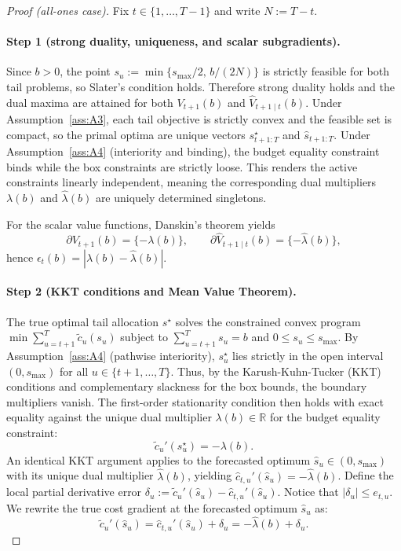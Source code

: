 \documentclass[11pt]{article}
\newcommand{\R}{\mathbb{R}}
\newcommand{\1}{\mathbf{1}}
\begin{document}
\begin{proof}[Proof (all-ones case)]
  Fix $t \in \{1,\dots,T-1\}$ and write $N := T-t$.

  \paragraph{Step 1 (strong duality, uniqueness, and scalar subgradients).}
  Since $b>0$, the point $s_u := \min\{s_{\max}/2,\,b/(2N)\}$ is strictly feasible for both tail problems, so Slater's condition holds.
  Therefore strong duality holds and the dual maxima are attained for both $V_{t+1}(b)$ and $\hat{V}_{t+1 \mid t}(b)$.
  Under Assumption~\ref{ass:A3}, each tail objective is strictly convex and the feasible set is compact, so the primal optima are unique vectors $s^{\star}_{t+1:T}$ and $\hat{s}_{t+1:T}$.
  Under Assumption~\ref{ass:A4} (interiority and binding), the budget equality constraint binds while the box constraints are strictly loose. This renders the active constraints linearly independent, meaning the corresponding dual multipliers $\lambda(b)$ and $\hat{\lambda}(b)$ are uniquely determined singletons.

  For the scalar value functions, Danskin's theorem yields
  \begin{equation*}
    \partial V_{t+1}(b) = \{-\lambda(b)\},
    \qquad
    \partial \hat{V}_{t+1\mid t}(b) = \{-\hat{\lambda}(b)\},
  \end{equation*}
  hence $\epsilon_t(b)=|\lambda(b)-\hat{\lambda}(b)|$.

  \paragraph{Step 2 (KKT conditions and Mean Value Theorem).}
  The true optimal tail allocation $s^{\star}$ solves the constrained convex program $\min \sum_{u=t+1}^T \tilde{c}_u(s_u)$ subject to $\sum_{u=t+1}^T s_u = b$ and $0 \leq s_u \leq s_{\max}$.
  By Assumption~\ref{ass:A4} (pathwise interiority), $s_u^{\star}$ lies strictly in the open interval $(0, s_{\max})$ for all $u \in \{t+1,\dots,T\}$.
  Thus, by the Karush-Kuhn-Tucker (KKT) conditions and complementary slackness for the box bounds, the boundary multipliers vanish.
  The first-order stationarity condition then holds with exact equality against the unique dual multiplier $\lambda(b) \in \R$ for the budget equality constraint:
  \begin{equation}
    \label{eq:kkt_simplified}
    \tilde{c}_u'(s_u^{\star}) = -\lambda(b).
  \end{equation}
  An identical KKT argument applies to the forecasted optimum $\hat{s}_u \in (0, s_{\max})$ with its unique dual multiplier $\hat{\lambda}(b)$, yielding $\hat{c}_{t,u}'(\hat{s}_u) = -\hat{\lambda}(b)$.
  Define the local partial derivative error $\delta_u := \tilde{c}_u'(\hat{s}_u) - \hat{c}_{t,u}'(\hat{s}_u)$. Notice that $|\delta_u| \leq e_{t,u}$.
  We rewrite the true cost gradient at the forecasted optimum $\hat{s}_u$ as:
  \begin{equation*}
    \tilde{c}_u'(\hat{s}_u) = \hat{c}_{t,u}'(\hat{s}_u) + \delta_u = -\hat{\lambda}(b) + \delta_u.
  \end{equation*}


\end{proof}
\end{document}
